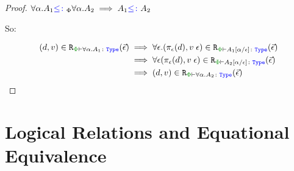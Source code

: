 \begin{framed}
\begin{proof}
    \case{\squant}
    $\forall \alpha. A_1{\color{blue} \leq\colon}_\Phi \forall \alpha. A_2\implies A_1{\color{blue} \leq\colon} A_2$
    
    So:
    
    \begin{align*}
        \inLogRelPE{d}{v}{\all{\a}{A_1}} & \implies \forall \e.\inLogRelPE{\pe(d)}{\eapp{v}{\e}}{A_1\ssub{\e}{\a}}\\
        & \implies \forall\e \inLogRelPE{\pe(d)}{\eapp{v}{\e}}{A_2\ssub{\e}{\a}}\\
        & \implies \inLogRelPE{d}{v}{\all{\a}{A_2}}
    \end{align*}
    \end{proof}
    
\end{framed}


\section{Logical Relations and Equational Equivalence}
\label{AdequacyEqEquivProof}
